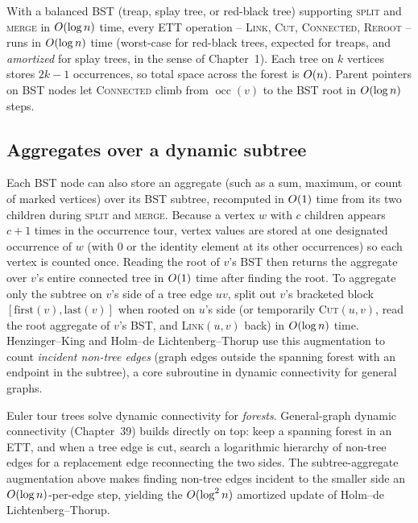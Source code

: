 \begin{complexitybox}
With a balanced BST (treap, splay tree, or red-black tree) supporting \textsc{split} and
\textsc{merge} in $O(\log n)$ time, every ETT operation -- \textsc{Link}, \textsc{Cut},
\textsc{Connected}, \textsc{Reroot} -- runs in $O(\log n)$ time (worst-case for red-black trees, expected for treaps, and \emph{amortized} for splay trees, in the sense of Chapter~1).
Each tree on $k$ vertices stores $2k-1$ occurrences, so total space across the forest is $O(n)$. Parent pointers on BST nodes let \textsc{Connected} climb from $\operatorname{occ}(v)$ to the BST root in $O(\log n)$ steps.
\end{complexitybox}

\subsection{Aggregates over a dynamic subtree}

Each BST node can also store an aggregate (such as a sum, maximum, or count of marked vertices) over its BST subtree, recomputed in $O(1)$ time from its two children during \textsc{split} and \textsc{merge}. Because a vertex $w$ with $c$ children appears $c+1$ times in the occurrence tour, vertex values are stored at one designated occurrence of $w$ (with $0$ or the identity element at its other occurrences) so each vertex is counted once. Reading the root of $v$'s BST then returns the aggregate over $v$'s entire connected tree in $O(1)$ time after finding the root. To aggregate only the subtree on $v$'s side of a tree edge $uv$, split out $v$'s bracketed block $[\mathrm{first}(v),\mathrm{last}(v)]$ when rooted on $u$'s side (or temporarily \textsc{Cut}$(u,v)$, read the root aggregate of $v$'s BST, and \textsc{Link}$(u,v)$ back) in $O(\log n)$ time. Henzinger--King and Holm--de Lichtenberg--Thorup use this augmentation to count \emph{incident non-tree edges} (graph edges outside the spanning forest with an endpoint in the subtree), a core subroutine in dynamic connectivity for general graphs.

\begin{connectionbox}
Euler tour trees solve dynamic connectivity for \emph{forests}. General-graph dynamic
connectivity (Chapter~39) builds directly on top: keep a
spanning forest in an ETT, and when a tree edge is cut, search a logarithmic hierarchy
of non-tree edges for a replacement edge reconnecting the two sides. The subtree-aggregate augmentation above makes finding non-tree edges incident to the smaller side an $O(\log n)$-per-edge step, yielding the $O(\log^2 n)$ amortized update of Holm--de Lichtenberg--Thorup.
\end{connectionbox}

